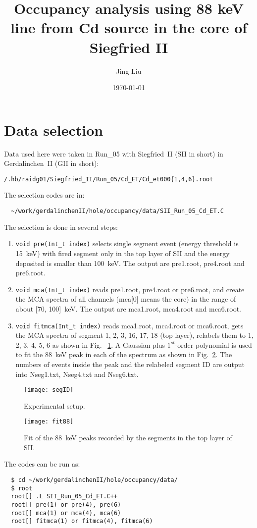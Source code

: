 \documentclass[12pt, a4paper]{article}
\title{Occupancy analysis using 88 keV line from Cd source in the core
  of Siegfried II}
\author{Jing Liu}
\date{\today{}}
\begin{document}
\maketitle{}
\tableofcontents

\section{Data selection}
\label{s:sel}
Data used here were taken in Run\_05 with Siegfried~II (SII in short)
in Gerdalinchen~II (GII in short):
\begin{lstlisting}
/.hb/raidg01/Siegfried_II/Run_05/Cd_ET/Cd_et000{1,4,6}.root
\end{lstlisting}
The selection codes are in:
\begin{lstlisting}
  ~/work/gerdalinchenII/hole/occupancy/data/SII_Run_05_Cd_ET.C
\end{lstlisting}
The selection is done in several steps:
\begin{enumerate}
\item \lstinline!void pre(Int_t index)! selects single segment event
  (energy threshold is 15~keV) with fired segment only in the top
  layer of SII and the energy deposited is smaller than 100~keV. The
  output are pre1.root, pre4.root and pre6.root.
\item \lstinline!void mca(Int_t index)! reads pre1.root, pre4.root or
  pre6.root, and create the MCA spectra of all channels (mca[0] means
  the core) in the range of about [70, 100]~keV. The output are
  mca1.root, mca4.root and mca6.root.
\item \lstinline!void fitmca(Int_t index)! reads mca1.root, mca4.root
  or mca6.root, gets the MCA spectra of segment 1, 2, 3, 16, 17, 18
  (top layer), relabels them to 1, 2, 3, 4, 5, 6 as shown in Fig.~
  \ref{f:setup}. A Gaussian plus $1^{st}$-order polynomial is used to
  fit the 88~keV peak in each of the spectrum as shown in
  Fig.~\ref{f:fit88}. The numbers of events inside the peak and the
  relabeled segment ID are output into Nseg1.txt, Nseg4.txt and
  Nseg6.txt.
\end{enumerate}

\begin{figure}[fptb]
  \centering
  \texttt{[image: segID]}
  \caption{Experimental setup.}
  \label{f:setup}
\end{figure}

\begin{figure}[fptb]
  \centering
  \texttt{[image: fit88]}
  \caption{Fit of the 88~keV peaks recorded by the segments in the top
    layer of SII.}
  \label{f:fit88}
\end{figure}
The codes can be run as:
\begin{lstlisting}
  $ cd ~/work/gerdalinchenII/hole/occupancy/data/
  $ root
  root[] .L SII_Run_05_Cd_ET.C++
  root[] pre(1) or pre(4), pre(6)
  root[] mca(1) or mca(4), mca(6)
  root[] fitmca(1) or fitmca(4), fitmca(6)
\end{lstlisting}
\end{document}
